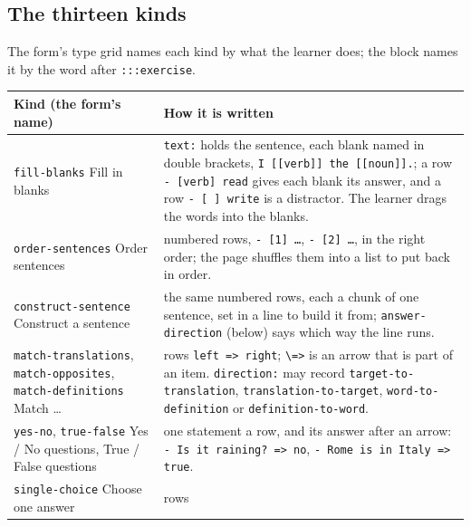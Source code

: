 \documentclass[11pt,oneside]{report}
\newcommand{\menu}[1]{\textsf{#1}}
\begin{document}
\subsection*{The thirteen kinds}

The form's type grid names each kind by what the learner does; the block
names it by the word after \texttt{:::exercise}.

\begin{center}
\small
\begin{longtable}{@{}>{\raggedright\arraybackslash}p{}>{\raggedright\arraybackslash}p{}@{}}
\toprule
\textsf{Kind (the form's name)} & \textsf{How it is written} \\
\midrule
\texttt{fill-blanks} \newline \menu{Fill in blanks} & \texttt{text:} holds
  the sentence, each blank named in double brackets, \texttt{I [[verb]] the
  [[noun]].}; a row \texttt{- [verb] read} gives each blank its answer, and a
  row \texttt{- [ ] write} is a distractor. The learner drags the words into
  the blanks. \\
\addlinespace
\texttt{order-sentences} \newline \menu{Order sentences} & numbered rows,
  \texttt{- [1] \ldots}, \texttt{- [2] \ldots}, in the right order; the page
  shuffles them into a list to put back in order. \\
\addlinespace
\texttt{construct-sentence} \newline \menu{Construct a sentence} & the same
  numbered rows, each a chunk of one sentence, set in a line to build it
  from; \texttt{answer-direction} (below) says which way the line runs. \\
\addlinespace
\texttt{match-translations}, \texttt{match-opposites},
\texttt{match-definitions} \newline \menu{Match \ldots} & rows
  \texttt{left => right}; \texttt{\textbackslash=>} is an arrow that is part
  of an item. \texttt{direction:} may record \texttt{target-to-translation},
  \texttt{translation-to-target}, \texttt{word-to-definition} or
  \texttt{definition-to-word}. \\
\addlinespace
\texttt{yes-no}, \texttt{true-false} \newline \menu{Yes / No questions},
\menu{True / False questions} & one statement a row, and its answer after an
  arrow: \texttt{- Is it raining? => no}, \texttt{- Rome is in Italy => true}. \\
\addlinespace
\texttt{single-choice} \newline \menu{Choose one answer} & rows

\end{longtable}
\end{center}
\end{document}
